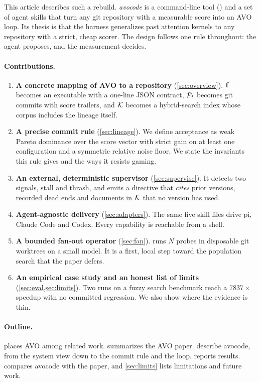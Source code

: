 This article describes such a rebuild. \emph{avocode} is a command-line tool () and a set
of agent skills that turn any git repository with a measurable score into an AVO loop. Its thesis
is that the harness generalizes past attention kernels to any repository with a strict, cheap
scorer. The design follows one rule throughout: the agent proposes, and the measurement decides.

\paragraph{Contributions.}
\begin{enumerate}[leftmargin=*,itemsep=2pt]
  \item \textbf{A concrete mapping of AVO to a repository} (\cref{sec:overview}). $\mathbf{f}$ becomes an
    executable with a one-line JSON contract, $\mathcal{P}_t$ becomes git commits with score trailers, and
    $\mathcal{K}$ becomes a hybrid-search index whose corpus includes the lineage itself.
  \item \textbf{A precise commit rule} (\cref{sec:lineage}). We define acceptance as weak Pareto
    dominance over the score vector with strict gain on at least one configuration and a
    symmetric relative noise floor. We state the invariants this rule gives and the ways it
    resists gaming.
  \item \textbf{An external, deterministic supervisor} (\cref{sec:supervise}). It detects two
    signals, stall and thrash, and emits a directive that \emph{cites} prior versions, recorded
    dead ends and documents in $\mathcal{K}$ that no version has used.
  \item \textbf{Agent-agnostic delivery} (\cref{sec:adapters}). The same five skill files drive
    pi, Claude Code and Codex. Every capability is reachable from a shell.
  \item \textbf{A bounded fan-out operator} (\cref{sec:fan}).  runs $N$ probes in
    disposable git worktrees on a small model. It is a first, local step toward the population
    search that the paper defers.
  \item \textbf{An empirical case study and an honest list of limits} (\cref{sec:eval,sec:limits}).
    Two runs on a fuzzy search benchmark reach a $7837\times$ speedup with no committed
    regression. We also show where the evidence is thin.
\end{enumerate}

\paragraph{Outline.}  places AVO among related work. 
summarizes the AVO paper.  describe
avocode, from the system view down to the commit rule and the loop.  reports
results.  compares avocode with the paper, and \cref{sec:limits} lists
limitations and future work.
